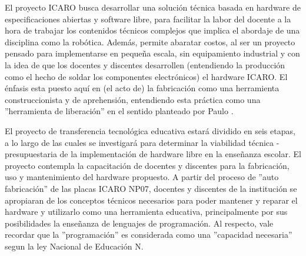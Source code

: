 El proyecto ICARO busca desarrollar una solución técnica basada en hardware de especificaciones abiertas y software libre, para facilitar la labor del docente a la hora de trabajar los contenidos técnicos complejos que implica el abordaje de una disciplina como la robótica. Además, permite abaratar costos, al ser un proyecto pensado para implementarse en pequeña escala, sin equipamiento industrial y con la idea de que los docentes y discentes desarrollen (entendiendo la producción como el hecho de soldar los componentes electrónicos) el hardware ICARO. El énfasis esta puesto aquí en (el acto de) la fabricación como una herramienta construccionista y de aprehensión, entendiendo esta práctica como una ''herramienta de liberación'' en el sentido planteado por Paulo \citet{freire_pedagogioprimido._2015}.

El proyecto de transferencia tecnológica educativa \citep{bareno2011metodologia} estará dividido en seis etapas, a lo largo de las cuales se investigará para determinar la viabilidad técnica - presupuestaria de la implementación de hardware libre en la enseñanza escolar. El proyecto contempla la capacitación de docentes y discentes para la fabricación, uso y mantenimiento del hardware propuesto. A partir del proceso de ''auto fabricación'' de las placas ICARO NP07,  docentes y discentes de la institución se apropiaran de los conceptos técnicos necesarios para poder mantener y reparar el hardware y  utilizarlo como una herramienta educativa, principalmente por sus posibilidades la enseñanza de lenguajes de programación. Al respecto, vale recordar que la ''programación'' es considerada como una ''capacidad necesaria'' segun la ley Nacional de Educación N.
%
